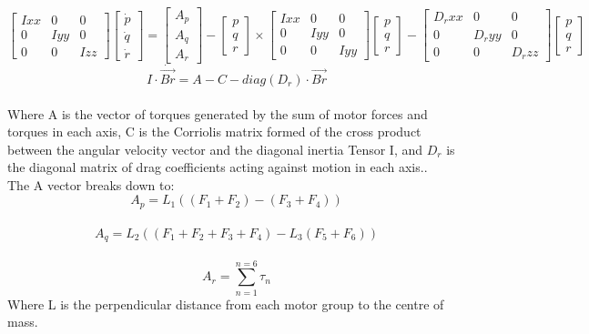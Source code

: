 \documentclass[12pt,a4paper,twoside]{report}
\begin{document}
					$$ 
					\begin{bmatrix}
						Ixx & 0 & 0 \\
						0 & Iyy & 0 \\
						0 & 0 & Izz
					\end{bmatrix} 
					\begin{bmatrix}
						\dot{p} \\
						\dot{q} \\
						\dot{r}
					\end{bmatrix}
					=
					\begin{bmatrix}
						A_p \\
						A_q \\
						A_r
					\end{bmatrix}
					-
					\begin{bmatrix}
						p \\
						q \\
						r 
					\end{bmatrix}
					\times
					\begin{bmatrix}
						Ixx & 0 & 0 \\
						0 & Iyy & 0 \\
						0 & 0 & Iyy
					\end{bmatrix}
					\begin{bmatrix}
						p \\
						q \\
						r 
					\end{bmatrix}
					-
					\begin{bmatrix}
						D_rxx & 0 & 0 \\
						0 & D_ryy & 0 \\
						0 & 0 & D_rzz
					\end{bmatrix}
					\begin{bmatrix}
						p \\
						q \\
						r
					\end{bmatrix}
					$$ 
					\[ I \cdot \dot{\vec{Br}} = A - C -  diag(D_r) \cdot \vec{Br}  \]
					\\
					Where A is the vector of torques generated by the sum of motor forces and torques in each axis, C is the Corriolis matrix formed of the cross product between the angular velocity vector and the diagonal inertia Tensor I, and \(D_r\) is the diagonal matrix of drag coefficients acting against motion in each axis.. 
					\\
					The A vector breaks down to:
					\\
					\[ A_p = L_1 ((F_1+F_2) - (F_3+F_4)) \]
					\\
					\[ A_q = L_2 ((F_1+F_2+F_3+F_4) - L_3 (F_5+F_6)) \]
					\\
					\[ A_r = \sum_{n = 1}^{n = 6}\tau_n \]
					Where L is the perpendicular distance from each motor group to the centre of mass.
					
\end{document}
